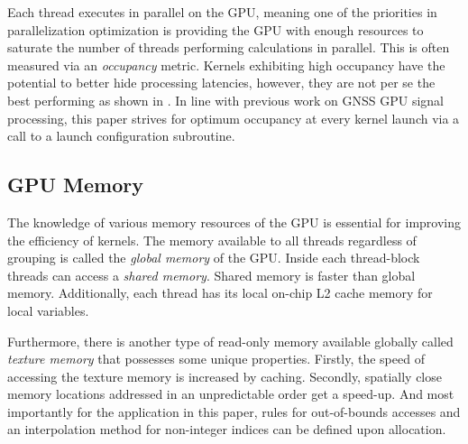 \documentclass{juliacon}
\begin{document}
Each thread executes in parallel on the GPU, meaning one of the priorities in parallelization optimization is providing the GPU with enough resources to saturate the number of threads performing calculations in parallel. This is often measured via an \emph{occupancy} metric. Kernels exhibiting high occupancy have the potential to better hide processing latencies, however, they are not per se the best performing as shown in \cite{Volkov2010}. In line with previous work on GNSS GPU signal processing, this paper strives for optimum occupancy at every kernel launch via a call to a launch configuration subroutine.

\subsection*{GPU Memory}
The knowledge of various memory resources of the GPU is essential for improving the efficiency of kernels. The memory available to all threads regardless of grouping is called the \emph{global memory} of the GPU. Inside each thread-block threads can access a \emph{shared memory}. Shared memory is faster than global memory. Additionally, each thread has its local on-chip L2 cache memory for local variables. 

Furthermore, there is another type of read-only memory available globally called \emph{texture memory} that possesses some unique properties. Firstly, the speed of accessing the texture memory is increased by caching. Secondly, spatially close memory locations addressed in an unpredictable order get a speed-up. And most importantly for the application in this paper, rules for out-of-bounds accesses and an interpolation method for non-integer indices can be defined upon allocation.
\end{document}

